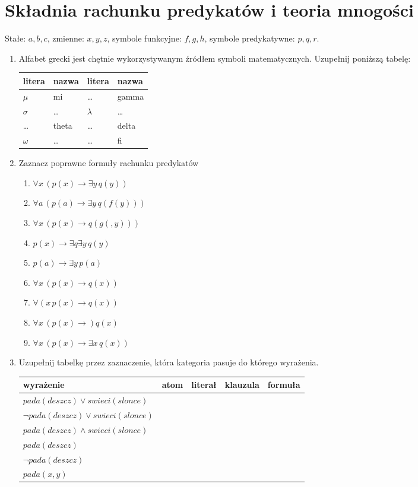 \documentclass{mwart}
\begin{document}
\section{Składnia rachunku predykatów i teoria mnogości}
Stałe: $a, b, c$, zmienne: $x, y, z$, symbole funkcyjne: $f, g, h$, symbole predykatywne: $p, q, r$.

\begin{enumerate}
\item Alfabet grecki jest chętnie wykorzystywanym źródłem symboli matematycznych. Uzupełnij poniższą tabelę:
\begin{tabular}{lp{6cm}|lp{6cm}}
litera & nazwa & litera & nazwa \\
\hline
$\mu$ & mi & \ldots & gamma \\
$\sigma$ & \ldots & $\lambda$ & \ldots \\
\ldots & theta & \ldots & delta \\
$\omega$ & \ldots & \ldots & fi \\
\end{tabular}
	\item Zaznacz poprawne formuły rachunku predykatów
		\begin{multicols}{3}
			\begin{enumerate}
				\item $\forall x\, (p(x)\to \exists y\, q(y))$
				\item $\forall a\, (p(a)\to \exists y\, q(f(y)))$
				\item $\forall x\, (p(x)\to q(g(, y)))$
				\item $p(x)\to \exists q\exists y\, q(y)$
				\item $p(a)\to \exists y\, p(a)$
				\item $\forall x\, (p(x)\to q(x))$
				\item $\forall (x\, p(x)\to q(x))$
				\item $\forall x\, (p(x)\to) q(x)$				
				\item $\forall x\, (p(x)\to \exists x\, q(x))$
			\end{enumerate}
		\end{multicols}
		
	\item Uzupełnij tabelkę przez zaznaczenie, która kategoria pasuje do którego wyrażenia.
	
	\begin{tabular}{|l|l|l|l|l|}
	\hline	
	wyrażenie & atom & literał & klauzula & formuła \\
	\hline
	$pada(deszcz) \lor swieci(slonce)$ & & & & \\
	\hline	
	$\lnot pada(deszcz) \lor swieci(slonce)$ & & & & \\
	\hline	
	$pada(deszcz) \land swieci(slonce)$ & & & & \\
	\hline	
	$pada(deszcz)$ & & & & \\
	\hline	
	$\lnot pada(deszcz)$ & & & & \\
	\hline	
	$pada(x, y)$ & & & & \\	
	\hline
	\end{tabular}



\end{enumerate}
\end{document}
